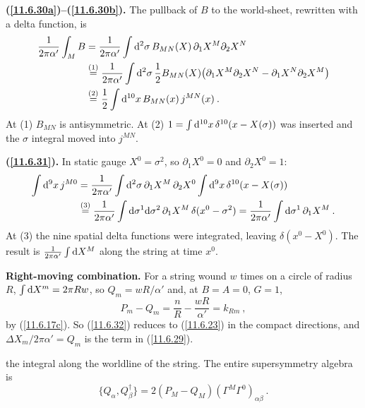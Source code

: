 \begin{tcolorbox}[breakable]
	\begin{remark}
		\textbf{(\ref{11.6.30a})--(\ref{11.6.30b}).} The pullback of $B$ to the world-sheet, rewritten with a delta function, is
		\begin{align*}
			\frac{1}{2\pi\alpha'}\int_{M}B&=\frac{1}{2\pi\alpha'}\int\mathrm{d}^{2}\sigma\,B_{MN}(X)\,\partial_{1}X^{M}\partial_{2}X^{N}\\
			&\overset{(1)}{=}\frac{1}{2\pi\alpha'}\int\mathrm{d}^{2}\sigma\,\frac{1}{2}B_{MN}(X)\bigl(\partial_{1}X^{M}\partial_{2}X^{N}-\partial_{1}X^{N}\partial_{2}X^{M}\bigr)\\
			&\overset{(2)}{=}\frac{1}{2}\int\mathrm{d}^{10}x\,B_{MN}(x)\,j^{MN}(x)\:.
		\end{align*}
		At (1) $B_{MN}$ is antisymmetric. At (2) $1=\int\mathrm{d}^{10}x\,\delta^{10}(x-X(\sigma))$ was inserted and the $\sigma$ integral moved into $j^{MN}$.

		\textbf{(\ref{11.6.31}).} In static gauge $X^{0}=\sigma^{2}$, so $\partial_{1}X^{0}=0$ and $\partial_{2}X^{0}=1$:
		\begin{align*}
			\int\mathrm{d}^{9}x\,j^{M0}&=\frac{1}{2\pi\alpha'}\int\mathrm{d}^{2}\sigma\,\partial_{1}X^{M}\,\partial_{2}X^{0}\int\mathrm{d}^{9}x\,\delta^{10}(x-X(\sigma))\\
			&\overset{(3)}{=}\frac{1}{2\pi\alpha'}\int\mathrm{d}\sigma^{1}\mathrm{d}\sigma^{2}\,\partial_{1}X^{M}\,\delta(x^{0}-\sigma^{2})
			=\frac{1}{2\pi\alpha'}\int\mathrm{d}\sigma^{1}\,\partial_{1}X^{M}\:.
		\end{align*}
		At (3) the nine spatial delta functions were integrated, leaving $\delta(x^{0}-X^{0})$. The result is $\frac{1}{2\pi\alpha'}\int\mathrm{d} X^{M}$ along the string at time $x^{0}$.

		\textbf{Right-moving combination.} For a string wound $w$ times on a circle of radius $R$, $\int\mathrm{d} X^{m}=2\pi Rw$, so $Q_{m}=wR/\alpha'$ and, at $B=A=0$, $G=1$,
		\begin{equation*}
			P_{m}-Q_{m}=\frac{n}{R}-\frac{wR}{\alpha'}=k_{Rm}\:,
		\end{equation*}
		by (\ref{11.6.17c}). So (\ref{11.6.32}) reduces to (\ref{11.6.23}) in the compact directions, and $\Delta X_{m}/2\pi\alpha'=Q_{m}$ is the term in (\ref{11.6.29}).
	\end{remark}
\end{tcolorbox}
the integral along the worldline of the string. The entire supersymmetry algebra is
\begin{equation}
	\{Q_{\alpha},Q^{\dag}_{\beta}\}=2(P_{M}-Q_{M})(\Gamma^{M}\Gamma^{0})_{\alpha\beta}\:. \label{11.6.32}
\end{equation}

